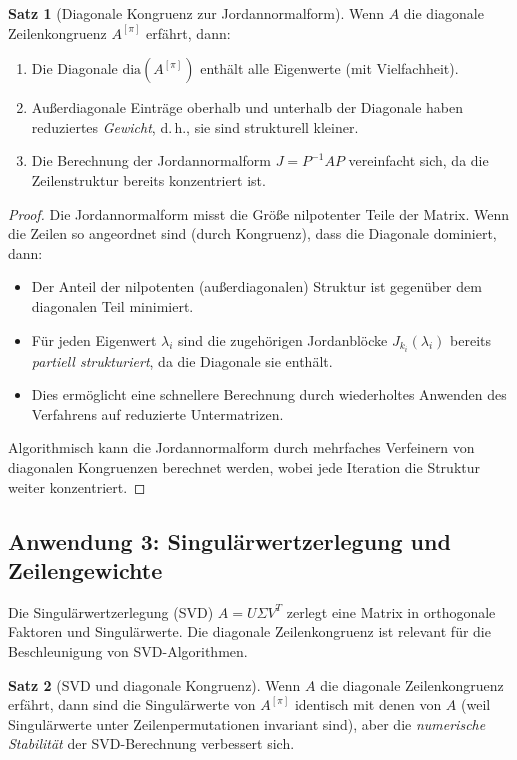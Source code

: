 \documentclass[a4paper,12pt]{article}
\theoremstyle{definition}
\newtheorem{satz}{Satz}
\begin{document}
\begin{satz}[Diagonale Kongruenz zur Jordannormalform]
	\label{satz:jordan-kongruenz}
	Wenn $A$ die diagonale Zeilenkongruenz $A^{[\pi]}$ erfährt, dann:
	\begin{enumerate}
		\item Die Diagonale $\text{dia}(A^{[\pi]})$ enthält alle Eigenwerte (mit Vielfachheit).
		\item Außerdiagonale Einträge oberhalb und unterhalb der Diagonale haben reduziertes \emph{Gewicht}, d.\,h., sie sind strukturell kleiner.
		\item Die Berechnung der Jordannormalform $J = P^{-1} A P$ vereinfacht sich, da die Zeilenstruktur bereits konzentriert ist.
	\end{enumerate}
\end{satz}

\begin{proof}
	Die Jordannormalform misst die Größe nilpotenter Teile der Matrix. Wenn die Zeilen so angeordnet sind (durch Kongruenz), dass die Diagonale dominiert, dann:
	
	\begin{itemize}
		\item Der Anteil der nilpotenten (außerdiagonalen) Struktur ist gegenüber dem diagonalen Teil minimiert.
		\item Für jeden Eigenwert $\lambda_i$ sind die zugehörigen Jordanblöcke $J_{k_i}(\lambda_i)$ bereits \emph{partiell strukturiert}, da die Diagonale sie enthält.
		\item Dies ermöglicht eine schnellere Berechnung durch wiederholtes Anwenden des Verfahrens auf reduzierte Untermatrizen.
	\end{itemize}
	
	Algorithmisch kann die Jordannormalform durch mehrfaches Verfeinern von diagonalen Kongruenzen berechnet werden, wobei jede Iteration die Struktur weiter konzentriert.
\end{proof}

\subsection{Anwendung 3: Singulärwertzerlegung und Zeilengewichte}

Die Singulärwertzerlegung (SVD) $A = U \Sigma V^T$ zerlegt eine Matrix in orthogonale Faktoren und Singulärwerte. Die diagonale Zeilenkongruenz ist relevant für die Beschleunigung von SVD-Algorithmen.

\begin{satz}[SVD und diagonale Kongruenz]
	\label{satz:svd-kongruenz}
	Wenn $A$ die diagonale Zeilenkongruenz erfährt, dann sind die Singulärwerte von $A^{[\pi]}$ identisch mit denen von $A$ (weil Singulärwerte unter Zeilenpermutationen invariant sind), aber die \emph{numerische Stabilität} der SVD-Berechnung verbessert sich.
\end{satz}
\end{document}
